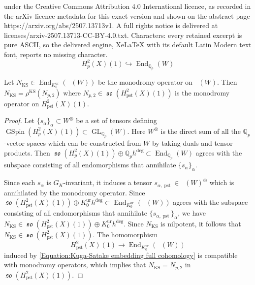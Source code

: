 \documentclass[10pt,a4paper]{amsart}
\DeclareMathOperator{\Dpst}{\mathit{D}_{\mathrm{pst}}}
\DeclareMathOperator{\pst}{pst}
\DeclareMathOperator{\ur}{ur}
\newcommand\End{\mathop{\mathrm{End}}\nolimits}
\newcommand\GL{\mathop{\mathrm{GL}}\nolimits}
\newcommand\GSpin{\mathop{\mathrm{GSpin}}\nolimits}
\newcommand\KS{\mathop{\mathrm{KS}}\nolimits}
\newcommand\so{\mathop{\mathfrak{so}}\nolimits}
\newcommand{\Q}{{\mathds Q}}
\begin{document}
under the Creative Commons Attribution 4.0 International licence, as recorded in the arXiv licence metadata for this exact version and shown on the abstract page https://arxiv.org/abs/2507.13713v1. A full rights notice is delivered at licenses/arxiv-2507.13713-CC-BY-4.0.txt. Characters: every retained excerpt is pure ASCII, so the delivered engine, XeLaTeX with its default Latin Modern text font, reports no missing character.
\begin{equation}\label{Equation:Kuga-Satake embedding full cohomology}
    H^2_{p}(X)(1) \hookrightarrow \End_{\Q_p}(W)
\end{equation}

\begin{lem}\label{Lemma:nilpotent operator on Kuga-Satake}
    Let $N_{\KS} \in \End_{K^{\ur}_0}(\Dpst(W))$
    be the monodromy operator on
$\Dpst(W)$.
Then
$
N_{\KS} = \rho^{\KS} (N_{p, 2})
$
where $N_{p,2} \in \so(H^2_{\pst}(X)(1))$ is the monodromy operator on $H^2_{\pst}(X)(1)$.
\end{lem}

\begin{proof}
Let $\{ s_{\alpha}\}_{\alpha}\subset W^{\otimes}$ be a set of tensors defining $\GSpin(H^2_p(X)(1)) \subset \GL_{\Q_p}(W)$.
Here $W^{\otimes}$ is the direct sum of all the $\Q_p$-vector spaces which can be constructed from $W$ by taking duals and tensor products.
Then
$\so(H^2_{p}(X)(1)) \oplus \Q_ph^{\deg} \subset \End_{\Q_p}(W)$
agrees with the subspace consisting of all endomorphisms that annihilate $\{ s_{\alpha}\}_\alpha$.

Since each $s_{\alpha}$ is $G_K$-invariant, it induces a tensor
$s_{\alpha, \pst} \in \Dpst(W)^\otimes$ which is annihilated by the monodromy operator.
Since
$\so(H^2_{\pst}(X)(1)) \oplus K^{\ur}_0h^{\deg} \subset \End_{K^{\ur}_0}(\Dpst(W))$
agrees with the subspace consisting of all endomorphisms that annihilate $\{ s_{\alpha, \pst}\}_\alpha$, we have
$
N_{\KS} \in \so(H^2_{\pst}(X)(1)) \oplus K^{\ur}_0h^{\deg}.
$
Since $N_{\KS}$ is nilpotent,
it follows that $N_{\KS} \in \so(H^2_{\pst}(X)(1))$.
The homomorphism
\[
H^2_{\pst}(X)(1) \to \End_{K^{\ur}_0}(\Dpst(W))
\]
induced by \eqref{Equation:Kuga-Satake embedding full cohomology} is compatible with monodromy operators, which implies that
$N_{\KS} =N_{p,2}$ in $\so(H^2_{\pst}(X)(1))$.
\end{proof}
\end{document}
